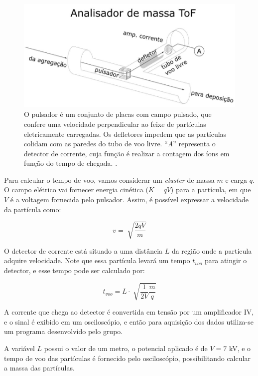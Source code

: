 \begin{figure}
  \centering
  \includegraphics[width=1\textwidth]{images/foca/tof}
  \caption{ O pulsador é um conjunto de placas com campo pulsado, que confere uma velocidade perpendicular ao feixe de partículas eletricamente carregadas. Os defletores impedem que as partículas colidam com as paredes do tubo de voo livre. ``\textit{A}'' representa o detector de corrente, cuja função é realizar a contagem dos íons em função do tempo de chegada.  \cite{dissertacao_kevin}.  }
  \label{fig:tof}
\end{figure}

Para calcular o tempo de voo, vamos considerar um \textit{cluster} de massa $m$ e carga $q$. O campo elétrico vai fornecer energia cinética ($K = qV$) para a partícula, em que $V$ é a voltagem fornecida pelo pulsador. Assim, é possível expressar a velocidade da partícula como:

\begin{equation}
v = \sqrt[]{\frac{2qV}{m}}
\end{equation}

O detector de corrente está situado a uma distância $L$ da região onde a partícula adquire velocidade. Note que essa partícula levará um tempo $t_{voo}$ para atingir o detector, e esse tempo pode ser calculado por:

\begin{equation}
\label{eq:tempo_voo}
t_{voo} = L \cdot \sqrt[]{\frac{1}{2V} \frac{m}{q}} 
\end{equation}


A corrente que chega ao detector é convertida em tensão por um amplificador IV, e o sinal é exibido em um osciloscópio, e então para aquisição dos dados utiliza-se um programa desenvolvido pelo grupo.

A variável $L$ possui o valor de um metro, o potencial aplicado é de $V = 7 $  kV, e o tempo de voo das partículas é fornecido pelo osciloscópio, possibilitando calcular a massa das partículas.

